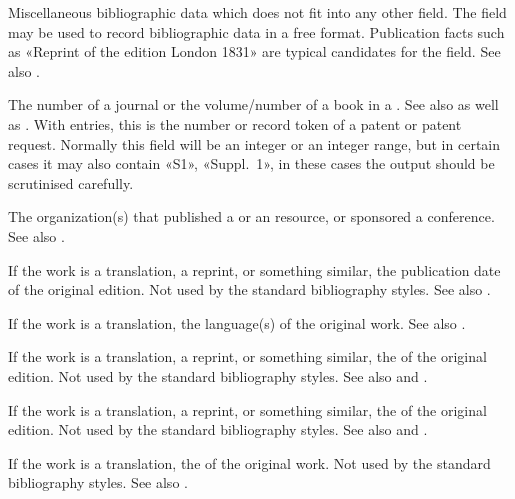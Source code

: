 \documentclass{ltxdockit}[2011/03/25]
\begin{document}
\begin{fieldlist}

Miscellaneous bibliographic data which does not fit into any other field. The  field may be used to record bibliographic data in a free format. Publication facts such as «Reprint of the edition London 1831» are typical candidates for the  field. See also .


The number of a journal or the volume\slash number of a book in a . See also  as well as . With  entries, this is the number or record token of a patent or patent request. Normally this field will be an integer or an integer range, but in certain cases it may also contain «S1», «Suppl.\ 1», in these cases the output should be scrutinised carefully.


The organization(s) that published a  or an  resource, or sponsored a conference. See also .


If the work is a translation, a reprint, or something similar, the publication date of the original edition. Not used by the standard bibliography styles. See also .


If the work is a translation, the language(s) of the original work. See also .


If the work is a translation, a reprint, or something similar, the  of the original edition. Not used by the standard bibliography styles. See also  and .


If the work is a translation, a reprint, or something similar, the  of the original edition. Not used by the standard bibliography styles. See also  and .


If the work is a translation, the  of the original work. Not used by the standard bibliography styles. See also .


\end{fieldlist}
\end{document}

